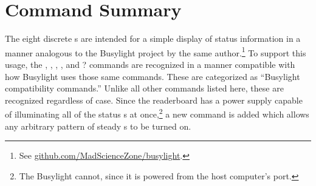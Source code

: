 %
%
%
%

\section{Command Summary}
The eight discrete \led s are intended for a simple display of status information
in a manner analogous to the Busylight project by the same author.\footnote{See
\href{https://github.com/MadScienceZone/busylight}{github.com/MadScienceZone/busylight}.}
To support this usage, the , , , \z*, and \z? commands are recognized
in a manner compatible with how Busylight uses those same commands. These are categorized
as ``Busylight compatibility commands.'' Unlike all other commands listed here, these are
recognized regardless of case.  Since the readerboard has a power supply capable of illuminating
all of the status \led s at once,\footnote{The Busylight cannot, since it is powered
from the host computer's  port.} a new command  is added which allows any
arbitrary pattern of steady \led s to be turned on.

